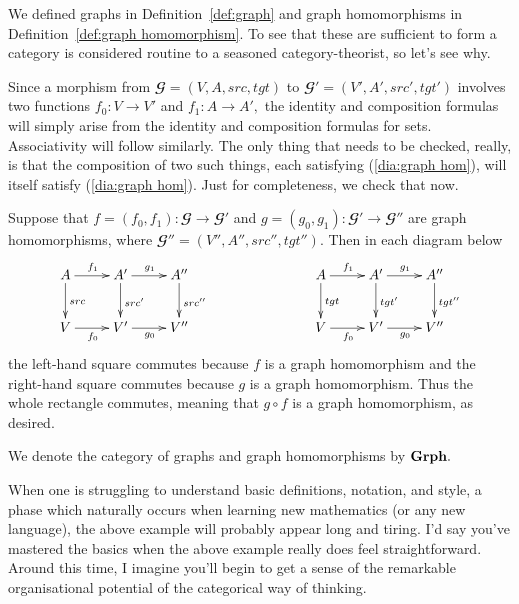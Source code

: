 \documentclass[../main/CT4S-EN-RU]{subfiles}
\begin{document}
\begin{exampleENG}
We defined graphs in Definition~\ref{def:graph} and graph homomorphisms in Definition~\ref{def:graph homomorphism}. To see that these are sufficient to form a category is considered routine to a seasoned category-theorist, so let's see why. 

Since a morphism from ${𝓖}=(V,A,src,tgt)$ to ${𝓖}'=(V',A',src',tgt')$ involves two functions $f_0\colon V{→} V'$ and $f_1\colon A{→} A',$ the identity and composition formulas will simply arise from the identity and composition formulas for sets. Associativity will follow similarly. The only thing that needs to be checked, really, is that the composition of two such things, each satisfying (\ref{dia:graph hom}), will itself satisfy (\ref{dia:graph hom}). Just for completeness, we check that now.

Suppose that $f=(f_0,f_1)\colon{𝓖}{→}{𝓖}'$ and $g=(g_0,g_1)\colon{𝓖}'{→}{𝓖}''$ are graph homomorphisms, where ${𝓖}''=(V'',A'',src'',tgt'').$ Then in each diagram below
\begin{align}\label{dia:graph hom comp}
\xymatrix{A\ar[r]^{f_1}\ar[d]^{src}&A'\ar[r]^{g_1}\ar[d]^{src'}&A''\ar[d]^{src''}\\V\ar[r]_{f_0}&V'\ar[r]_{g_0}&V''
}\hspace{1in}
\xymatrix{A\ar[r]^{f_1}\ar[d]^{tgt}&A'\ar[d]^{tgt'}\ar[r]^{g_1}&A''\ar[d]^{tgt''}\\V\ar[r]_{f_0}&V'\ar[r]_{g_0}&V''
}
\end{align}
the left-hand square commutes because $f$ is a graph homomorphism and the right-hand square commutes because $g$ is a graph homomorphism. Thus the whole rectangle commutes, meaning that $g\circ f$ is a graph homomorphism, as desired. 

We denote the category of graphs and graph homomorphisms by ${\mathbf{Grph}}.$
\end{exampleENG}

\begin{exampleRUS}
\end{exampleRUS}

\begin{remarkENG}
When one is struggling to understand basic definitions, notation, and style, a phase which naturally occurs when learning new mathematics (or any new language), the above example will probably appear long and tiring. I'd say you've mastered the basics when the above example really does feel straightforward. Around this time, I imagine you'll begin to get a sense of the remarkable organisational potential of the categorical way of thinking.
\end{remarkENG} 
\end{document}
